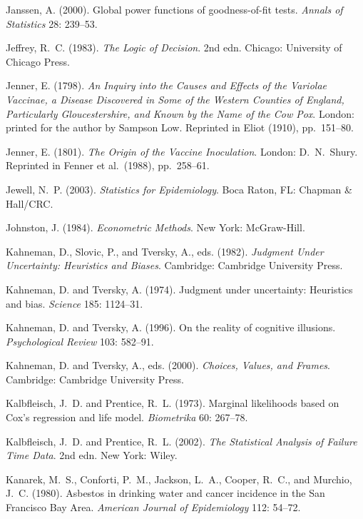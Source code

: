 \smallskip\noindent
Janssen, A. (2000).
Global power functions of goodness-of-fit tests.
{\it Annals of Statistics\/} 28: 239--53.

\smallskip\noindent
Jeffrey, R.~C. (1983).
{\it  The Logic of Decision\/}. 2nd edn.
Chicago: University of Chicago Press.

\smallskip\noindent
Jenner, E. (1798).
{\it An Inquiry into the Causes and Effects of the Variolae Vaccinae,
a Disease Discovered in Some of the Western Counties of England,
Particularly Gloucestershire, and Known by the Name of the Cow Pox\/}.
London: printed for the author by Sampson Low.
Reprinted in Eliot (1910), pp.~151--80.

\smallskip\noindent
Jenner, E. (1801).
{\it The Origin of the Vaccine Inoculation\/}.
London: D.~N.~Shury.
Reprinted in Fenner et al.~(1988), pp.~258--61.

\smallskip\noindent
Jewell, N.~P. (2003).
{\it Statistics for Epidemiology\/}.
Boca Raton, FL: Chapman \& Hall/CRC.

\smallskip\noindent
Johnston, J. (1984).
{\it Econometric Methods\/}.
New York: McGraw-Hill.

\smallskip\noindent
Kahneman, D., Slovic, P., and Tversky, A., eds. (1982).
{\it Judgment Under Uncertainty:  Heuristics and Biases\/}.
Cambridge: Cambridge University Press.

\smallskip\noindent
Kahneman, D. and Tversky, A. (1974).
Judgment under uncertainty:  Heuristics and bias.
{\it Science\/} 185: 1124--31.

\smallskip\noindent
Kahneman, D. and Tversky, A. (1996).
On the reality of cognitive illusions.
{\it Psychological Review\/} 103: 582--91.

\smallskip\noindent
Kahneman, D. and Tversky, A., eds. (2000).
{\it Choices, Values, and Frames\/}.
Cambridge: Cambridge University Press.

\smallskip\noindent
Kalbfleisch, J.~D. and Prentice, R.~L. (1973).
Marginal likelihoods based on Cox's regression and life model.
{\it Biometrika\/} 60: 267--78.

\smallskip\noindent
Kalbfleisch, J.~D. and Prentice, R.~L. (2002).
{\it The Statistical Analysis of Failure Time Data\/}. 2nd edn.
New York: Wiley.

\smallskip\noindent
Kanarek, M.~S., Conforti, P.~M., Jackson, L.~A., Cooper, R.~C., and Murchio, J.~C. (1980).
Asbestos in drinking water and cancer incidence in the San Francisco Bay Area.
{\it American Journal of Epidemiology\/} 112: 54--72.

